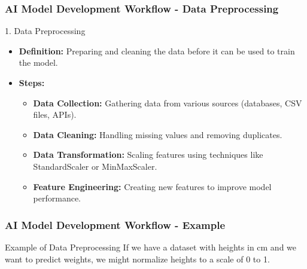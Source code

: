 \documentclass{beamer}
\begin{document}
\begin{frame}[fragile]

\frametitle{AI Model Development Workflow - Data Preprocessing}

\begin{block}{1. Data Preprocessing}
    \begin{itemize}
        \item \textbf{Definition:} Preparing and cleaning the data before it can be used to train the model.
        
        \item \textbf{Steps:}
        \begin{itemize}
            \item \textbf{Data Collection:} Gathering data from various sources (databases, CSV files, APIs).
            \item \textbf{Data Cleaning:} Handling missing values and removing duplicates.
            \item \textbf{Data Transformation:} Scaling features using techniques like StandardScaler or MinMaxScaler.
            \item \textbf{Feature Engineering:} Creating new features to improve model performance.
        \end{itemize}
    \end{itemize}
\end{block}

\end{frame}

\begin{frame}[fragile]

\frametitle{AI Model Development Workflow - Example}

\begin{block}{Example of Data Preprocessing}
If we have a dataset with heights in cm and we want to predict weights, we might normalize heights to a scale of 0 to 1.
\end{block}

\end{frame}
\end{document}
